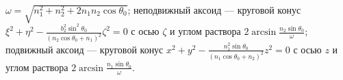$\omega = \sqrt{n^2_1 + n^2_2 + 2n_1n_2\cos{\theta _0}}$;
неподвижный аксоид --- круговой конус 
$\xi ^2 + \eta ^2 - 
\frac{b^2_2 \sin^2{\theta _0}}{(n_2\cos{\theta _0} + n_1)^2}\zeta ^2 = 0$
с осью $\zeta$ и углом раствора $2\arcsin{\frac{n_2\sin{\theta _0}}{\omega}}$;
подвижный аксоид --- круговой конус
$x^2 + y^2 - \frac{n^2_1 \sin{\theta _0}}{(n_1\cos{\theta _0} + n_2)^2}z^2 = 0$
с осью $z$ и углом раствора $2\arcsin{\frac{n_1\sin{\theta _0}}{\omega}}$.
